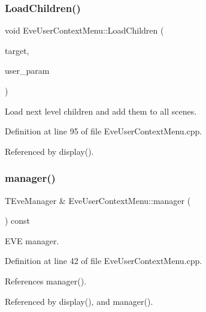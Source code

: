 \subsubsection{\texorpdfstring{Load\+Children()}{LoadChildren()}}
{\footnotesize\ttfamily void Eve\+User\+Context\+Menu\+::\+Load\+Children (\begin{DoxyParamCaption}\item[{\hyperlink{class_t_object}{T\+Object} $\ast$}]{target,  }\item[{void $\ast$}]{user\+\_\+param }\end{DoxyParamCaption})}



Load next level children and add them to all scenes. 



Definition at line 95 of file Eve\+User\+Context\+Menu.\+cpp.



Referenced by display().

\hypertarget{class_d_d4hep_1_1_eve_user_context_menu_af1d8f67a8ce80010f1848bf0cdd9e579}{}\label{class_d_d4hep_1_1_eve_user_context_menu_af1d8f67a8ce80010f1848bf0cdd9e579} 
\subsubsection{\texorpdfstring{manager()}{manager()}}
{\footnotesize\ttfamily T\+Eve\+Manager \& Eve\+User\+Context\+Menu\+::manager (\begin{DoxyParamCaption}{ }\end{DoxyParamCaption}) const}



E\+VE manager. 



Definition at line 42 of file Eve\+User\+Context\+Menu.\+cpp.



References manager().



Referenced by display(), and manager().

\hypertarget{class_d_d4hep_1_1_eve_user_context_menu_a0ee719ceeea4256e11c3381657df7c24}{}\label{class_d_d4hep_1_1_eve_user_context_menu_a0ee719ceeea4256e11c3381657df7c24} 
